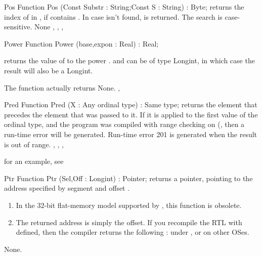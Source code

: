 \documentclass{report}
\begin{document}

\begin{function}{Pos}
\Declaration
Function Pos (Const Substr : String;Const S : String) : Byte;
\Description
{} returns the index of  in , if  contains
. In case  isn't found,  is returned.
The search is case-sensitive.
\Errors
None
\SeeAlso
{}, , , 
\end{function}


\begin{function}{Power}
\Declaration
Function Power (base,expon : Real) : Real;
\Description

 returns the value of  to the power .
 and  can be of type Longint, in which case the
result will also be a Longint.

The function actually returns 
\Errors
None.
\SeeAlso
{}, 
\end{function}


\begin{function}{Pred}
\Declaration
Function Pred (X : Any ordinal type) : Same type;
\Description
  returns the element that precedes the element that was passed
to it. If it is applied to the first value of the ordinal type, and the
program was compiled with range checking on (, then a run-time
error will be generated.
\Errors
Run-time error 201 is generated when the result is out of
range.
\SeeAlso
{}, , , 
\end{function}

for an example, see 

\begin{function}{Ptr}
\Declaration
Function Ptr (Sel,Off : Longint) : Pointer;
\Description
{} returns a pointer, pointing to the address specified by
segment  and offset .

 \begin{remark} 
\begin{enumerate}
\item In the 32-bit flat-memory model supported by \fpc, this
function is obsolete.
\item The returned address is simply the offset. If you recompile
the RTL with  defined, then the compiler returns the
following :  under \dos, or
 on other OSes.
\end{enumerate}
\end{remark}
\Errors
None.
\SeeAlso
{}
\end{function}
\end{document}
